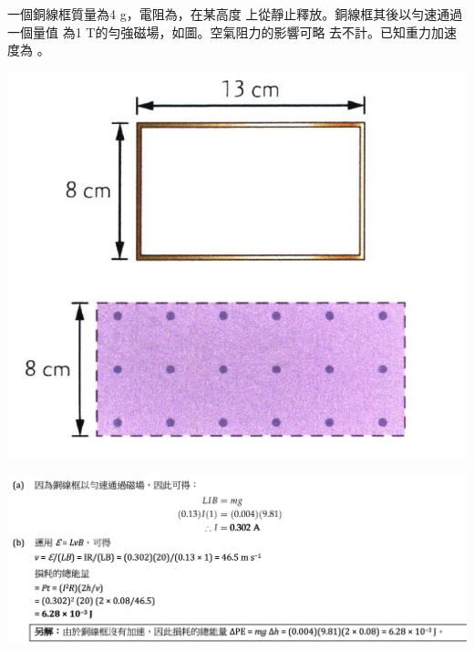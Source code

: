 {
    一個銅線框質量為4 g，電阻為，在某高度 上從靜止釋放。銅線框其後以勻速通過一個量值 為1 T的勻強磁場，如圖。空氣阻力的影響可略 去不計。已知重力加速度為 。
    \par{\par\centering\includegraphics[width=.3\textwidth]{./img/ch5_induction_lq_2024-06-24-17-14-06.png}\par}

}{\par{\par\centering\includegraphics[width=\textwidth]{./img/ch5_induction_lq_2024-06-24-17-39-43.png}\par}}


